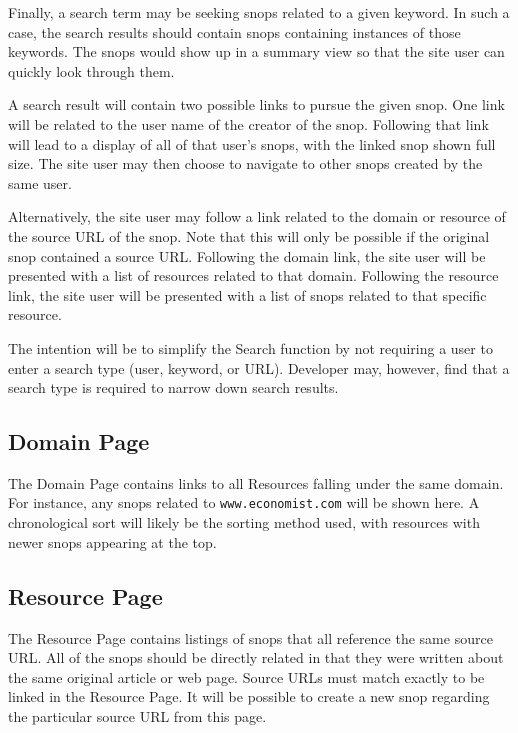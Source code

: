 \documentclass[11pt]{article}
\begin{document}
Finally, a search term may be seeking snops related to a given keyword. In such a case, the search results should contain snops containing instances of those keywords. The snops would show up in a summary view so that the site user can quickly look through them.

A search result will contain two possible links to pursue the given snop. One link will be related to the user name of the creator of the snop. Following that link will lead to a display of all of that user's snops, with the linked snop shown full size. The site user may then choose to navigate to other snops created by the same user.

Alternatively, the site user may follow a link related to the domain or resource of the source URL of the snop. Note that this will only be possible if the original snop contained a source URL. Following the domain link, the site user will be presented with a list of resources related to that domain. Following the resource link, the site user will be presented with a list of snops related to that specific resource.

The intention will be to simplify the Search function by not requiring a user to enter a search type (user, keyword, or URL). Developer may, however, find that a search type is required to narrow down search results.
\subsection{Domain Page}
\label{sec:domain_page}
The Domain Page contains links to all Resources falling under the same domain. For instance, any snops related to \texttt{www.economist.com} will be shown here. A chronological sort will likely be the sorting method used, with resources with newer snops appearing at the top.
\subsection{Resource Page}
\label{sec:resource_page}
The Resource Page contains listings of snops that all reference the same source URL. All of the snops should be directly related in that they were written about the same original article or web page. Source URLs must match exactly to be linked in the Resource Page. It will be possible to create a new snop regarding the particular source URL from this page. 
\end{document}
